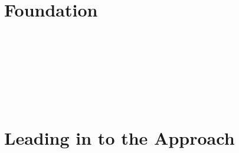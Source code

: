 \documentclass[12pt,oneside]{book}
\begin{document}
\newtheorem*{mydef}{Definition}






\newpage \ %
\part{Foundation}

%

\newpage\ 


\newpage\ 


\newpage\ 


\newpage\ %
\part{Leading in to the Approach}
\newpage\ 

\end{document}
